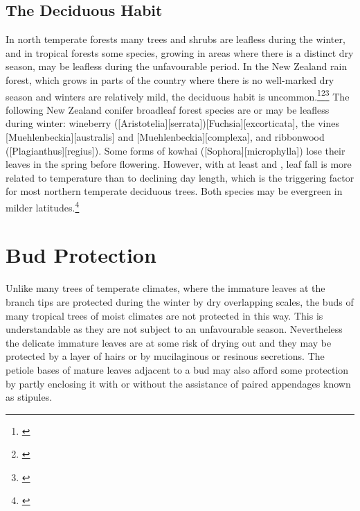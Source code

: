 \subsection{The Deciduous Habit}

In north temperate forests many trees and shrubs are leafless during the winter, and in tropical forests some species, growing in areas where there is a distinct dry season, may be leafless during the unfavourable period.
In the New Zealand rain forest, which grows in parts of the country where there is no well-marked dry season and winters are relatively mild, the deciduous habit is uncommon.\footnote{\cite{bussell1968growth}}\footnote{\cite{bussell1968effects}}\footnote{\cite{russel1936mechanism}} The following New Zealand conifer broadleaf forest species are or may be leafless during winter: wineberry ([Aristotelia][serrata])[Fuchsia][excorticata], the vines [Muehlenbeckia][australis] and [Muehlenbeckia][complexa], and ribbonwood ([Plagianthus][regius]).
Some forms of kowhai ([Sophora][microphylla]) lose their leaves in the spring before flowering.
However, with at least  and , leaf fall is more related to temperature than to declining day length, which is the triggering factor for most northern temperate deciduous trees.
Both species may be evergreen in milder latitudes.\footnote{\cite{cockayne1928vegetation}}

\section{Bud Protection}

Unlike many trees of temperate climates, where the immature leaves at the branch tips are protected during the winter by dry overlapping scales, the buds of many tropical trees of moist climates are not protected in this way.
This is understandable as they are not subject to an unfavourable season.
Nevertheless the delicate immature leaves are at some risk of drying out and they may be protected by a layer of hairs or by mucilaginous or resinous secretions.
The petiole bases of mature leaves adjacent to a bud may also afford some protection by partly enclosing it with or without the assistance of paired appendages known as stipules.

